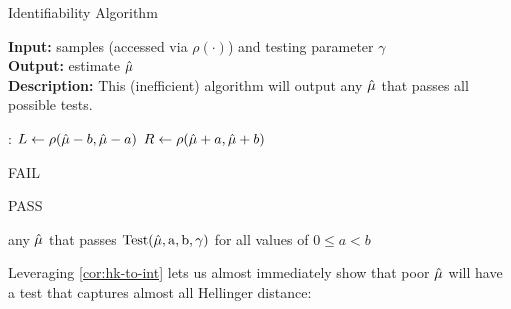 \begin{algorithm}[t]
    \caption{Identifiability Algorithm} \label{algo:ident}
    \hspace*{\algorithmicindent} 
    \begin{flushleft}
      {\bf Input:} samples (accessed via $\rho(\cdot)$) and testing parameter $\gamma$  \\
      {\bf Output:} estimate $\hat{\mu}$\\
      {\bf Description:} This (inefficient) algorithm will output any $\hat{\mu}$ that passes all possible tests.
    \end{flushleft}
    \begin{algorithmic}[1]
    
    :
    \State $L \gets \rho(\hat{\mu} - b,  \hat{\mu} - a)$ 
    \State $R \gets \rho(\hat{\mu}+a,\hat{\mu} + b)$  
    
    
            \Return FAIL 
    \Else
    
        \Return PASS 
    \EndIf

    \EndProcedure

    
        \Return any $\hat{\mu}$ that passes $\operatorname{Test(\hat{\mu},a,b,\gamma)}$ for all values of $0 \le a < b$
    \EndProcedure
    \end{algorithmic}
\end{algorithm}

Leveraging \cref{cor:hk-to-int} lets us almost immediately show that poor $\hat{\mu}$ will have a test that captures almost all Hellinger distance:

